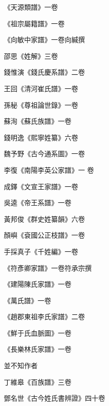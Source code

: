 \begin{pinyinscope}
 《天源類譜》一卷



 《祖宗屬籍譜》一卷



 《向敏中家譜》一卷向緘撰



 邵思《姓解》三卷



 錢惟演《錢氏慶系譜》二卷



 王回《清河崔氏譜》一卷



 孫秘《尊祖論世錄》一卷



 蘇洵《蘇氏族譜》一卷



 錢明逸《熙寧姓纂》六卷



 魏予野《古今通系圖》一卷



 李復《南陽李英公家譜》一
 卷



 成鐸《文宣王家譜》一卷



 吳逵《帝王系譜》一卷



 黃邦俊《群史姓纂韻》六卷



 顏嶼《袞國公正枝譜》一卷



 手採真子《千姓編》一卷



 《符彥卿家譜》一卷符承宗撰



 《建陽陳氏家譜》一卷



 《萬氏譜》一卷



 《趙郡東祖李氏家譜》二卷



 《鮮于氏血脈圖》一卷



 《長樂林氏家譜》一卷



 並不知作者



 丁維皋《百族譜》三卷



 鄧名世《古今姓氏書辨證》四十卷




\end{pinyinscope}
